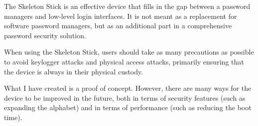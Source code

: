 \documentclass{article}
\begin{document}
The Skeleton Stick is an effective device that fills in the gap between a password managers and low-level login interfaces. It is not meant as a replacement for software password managers, but as an additional part in a comprehensive password security solution.

When using the Skeleton Stick, users should take as many precautions as possible to avoid keylogger attacks and physical access attacks, primarily ensuring that the device is always in their physical custody.

What I have created is a proof of concept. However, there are many ways for the device to be improved in the future, both in terms of security features (such as expanding the alphabet) and in terms of performance (such as reducing the boot time).
\end{document}
